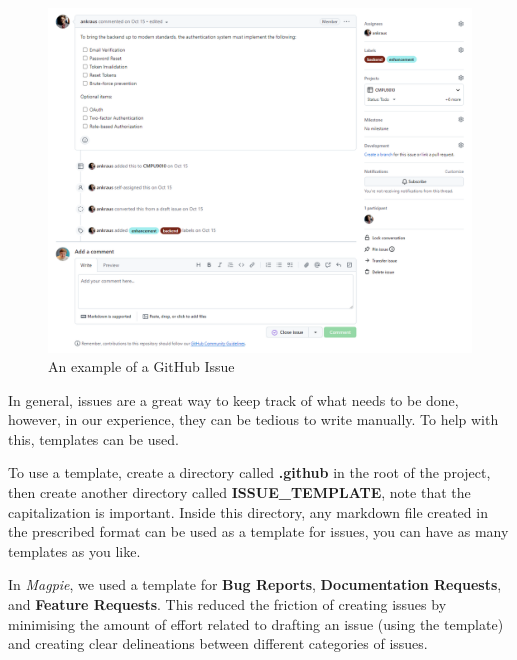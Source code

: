 \begin{figure}[htbp]
    \centering{}
    \includegraphics[width=\textwidth]{images/github_issue.png}
    \caption{An example of a GitHub Issue}
\end{figure}

\newpage{}

In general, issues are a great way to keep track of what needs to be done,
however, in our experience, they can be tedious to write manually. To help with
this, templates can be used.

To use a template, create a directory called \textbf{.github} in the root of the
project, then create another directory called \textbf{ISSUE\_TEMPLATE}, note
that the capitalization is important. Inside this directory, any markdown file
created in the prescribed format can be used as a template for issues, you can
have as many templates as you like.

In \textit{Magpie}, we used a template for \textbf{Bug Reports},
\textbf{Documentation Requests}, and \textbf{Feature Requests}. This reduced the
friction of creating issues by minimising the amount of effort related to
drafting an issue (using the template) and creating clear delineations between
different categories of issues.

